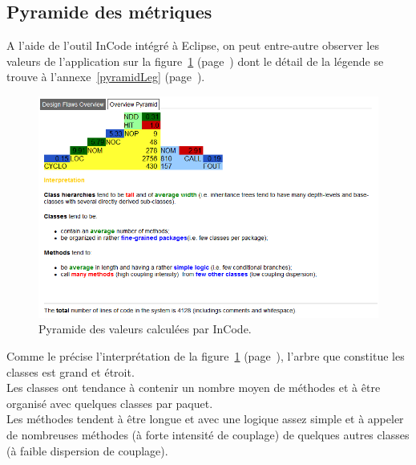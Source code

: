 \documentclass[12pt,a4paper,final]{article}
\newcommand{\annexe}[1]{annexe~\ref{#1} (page~\pageref{#1})}
\newcommand{\labelfigure}[1]{figure~\ref{#1} (page~\pageref{#1})}
\begin{document}
\subsection{Pyramide des métriques}
A l'aide de l'outil InCode intégré à Eclipse, on peut entre-autre observer les valeurs de l'application sur la \labelfigure{pyramid} dont le détail de la légende se trouve à l'\annexe{pyramidLeg}.
\begin{figure}[!h]
	\centering
	\includegraphics[width=\textwidth]{InCodePyramid.png}
	\caption{\label{pyramid}Pyramide des valeurs calculées par InCode.}
\end{figure}
Comme le précise l'interprétation de la \labelfigure{pyramid}, l'arbre que constitue les classes est grand et étroit.\\
Les classes ont tendance à contenir un nombre moyen de méthodes et à être organisé avec quelques classes par paquet.\\
Les méthodes tendent à être longue et avec une logique assez simple et à appeler de nombreuses méthodes (à forte intensité de couplage) de quelques autres classes (à faible dispersion de couplage).

\clearpage
\end{document}
